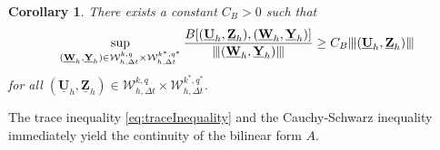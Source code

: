 \documentclass[sn-mathphys-num]{sn-jnl}
\newtheorem{cor}[thm]{Corollary}
\numberwithin{equation}{section}
\newcommand{\tnorm}[1]{\vert\hspace{-0.3mm}\Vert#1\Vert\hspace{-0.3mm}\vert}
\newcommand{\ProdFullyDiscrSpace}[2]{ \mathcal{W}^{ {#1},{#2}}_{h, \Delta t  } }
\newcommand{\Uh}{\underline{\mathbf{U}}_h}
\newcommand{\Yh}{\underline{\mathbf{Y}}_h}
\newcommand{\Zh}{\underline{\mathbf{Z}}_h}
\newcommand{\Wh}{\underline{\mathbf{W}}_h}
\begin{document}
\begin{cor}\label{cor:infsup}
    There exists a constant $C_B>0$ such that 
    \begin{equation}
        \sup_{(\Wh,\Yh) \in \ProdFullyDiscrSpace{k}{q} \times \ProdFullyDiscrSpace{k^\ast}{q^\ast}} \frac{B[(\Uh,\Zh),(\Wh,\Yh)]}{\tnorm{(\Wh,\Yh)}} \ge C_B \tnorm{(\Uh,\Zh)}
    \end{equation}
    for all $(\Uh,\Zh) \in \ProdFullyDiscrSpace{k}{q} \times \ProdFullyDiscrSpace{k^\ast}{q^\ast}$.
\end{cor}



The trace inequality \eqref{eq:traceInequality} and the Cauchy-Schwarz inequality immediately yield the continuity of the bilinear form $A$.
\end{document}
